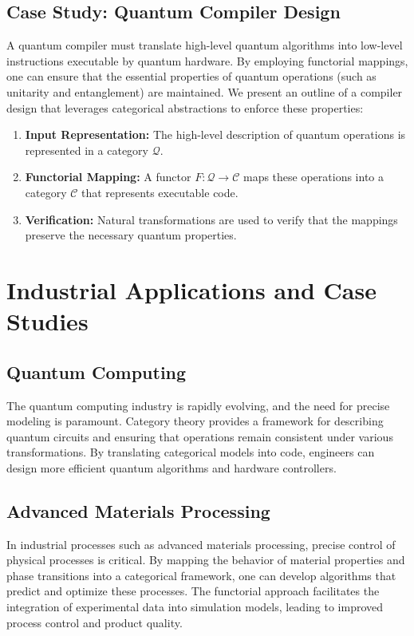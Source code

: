 \documentclass[11pt]{article}
\begin{document}
\subsection{Case Study: Quantum Compiler Design}
A quantum compiler must translate high-level quantum algorithms into low-level instructions executable by quantum hardware. By employing functorial mappings, one can ensure that the essential properties of quantum operations (such as unitarity and entanglement) are maintained. We present an outline of a compiler design that leverages categorical abstractions to enforce these properties:
\begin{enumerate}[label=(\alph*)]
    \item \textbf{Input Representation:} The high-level description of quantum operations is represented in a category $\mathcal{Q}$.
    \item \textbf{Functorial Mapping:} A functor $F: \mathcal{Q} \to \mathcal{C}$ maps these operations into a category $\mathcal{C}$ that represents executable code.
    \item \textbf{Verification:} Natural transformations are used to verify that the mappings preserve the necessary quantum properties.
\end{enumerate}

\section{Industrial Applications and Case Studies}
\subsection{Quantum Computing}
The quantum computing industry is rapidly evolving, and the need for precise modeling is paramount. Category theory provides a framework for describing quantum circuits and ensuring that operations remain consistent under various transformations. By translating categorical models into code, engineers can design more efficient quantum algorithms and hardware controllers.

\subsection{Advanced Materials Processing}
In industrial processes such as advanced materials processing, precise control of physical processes is critical. By mapping the behavior of material properties and phase transitions into a categorical framework, one can develop algorithms that predict and optimize these processes. The functorial approach facilitates the integration of experimental data into simulation models, leading to improved process control and product quality.
\end{document}

